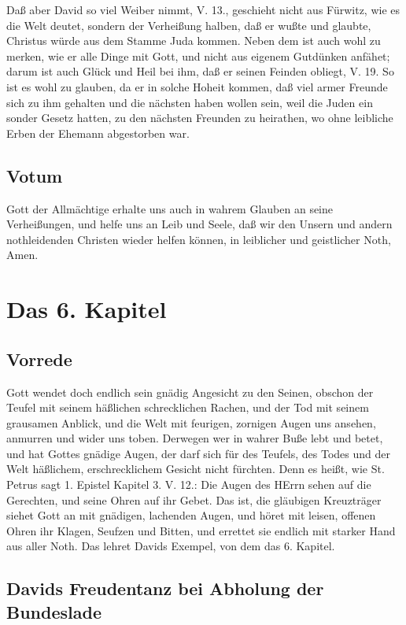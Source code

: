 Daß aber David so viel Weiber nimmt, V. 13., geschieht nicht aus Fürwitz, wie es die Welt deutet, sondern der Verheißung halben, daß er wußte und glaubte, Christus würde aus dem Stamme Juda kommen. Neben dem ist auch wohl zu merken, wie er alle Dinge mit Gott, und nicht aus eigenem Gutdünken anfähet; darum ist auch Glück und Heil bei ihm, daß er seinen Feinden obliegt, V. 19. So ist es wohl zu glauben, da er in solche Hoheit kommen, daß viel armer Freunde sich zu ihm gehalten und die nächsten haben wollen sein, weil die Juden ein sonder Gesetz hatten, zu den nächsten Freunden zu heirathen, wo ohne leibliche Erben der Ehemann abgestorben war.

\section{Votum}

Gott der Allmächtige erhalte uns auch in wahrem Glauben an seine Verheißungen, und helfe uns an Leib und Seele, daß wir den Unsern und andern nothleidenden Christen wieder helfen können, in leiblicher und geistlicher Noth, Amen.

\chapter{Das 6. Kapitel}

\section{Vorrede}

Gott wendet doch endlich sein gnädig Angesicht zu den Seinen, obschon der Teufel mit seinem häßlichen schrecklichen Rachen, und der Tod mit seinem grausamen Anblick, und die Welt mit feurigen, zornigen Augen uns ansehen, anmurren und wider uns toben. Derwegen wer in wahrer Buße lebt und betet, und hat Gottes gnädige Augen, der darf sich für des Teufels, des Todes und der Welt häßlichem, erschrecklichem Gesicht nicht fürchten. Denn es heißt, wie St. Petrus sagt 1. Epistel Kapitel 3. V. 12.: Die Augen des HErrn sehen auf die Gerechten, und seine Ohren auf ihr Gebet. Das ist, die gläubigen Kreuzträger siehet Gott an mit gnädigen, lachenden Augen, und höret mit leisen, offenen Ohren ihr Klagen, Seufzen und Bitten, und errettet sie endlich mit starker Hand aus aller Noth. Das lehret Davids Exempel, von dem das 6. Kapitel.

\section{Davids Freudentanz bei Abholung der Bundeslade}

